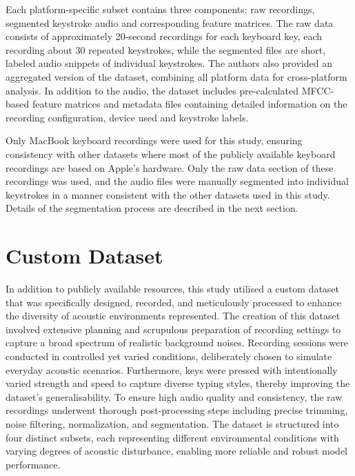 \documentclass[a4paper,11pt,twoside]{report}
\theoremstyle{definition}
\begin{document}
Each platform-specific subset contains three components: raw recordings, segmented keystroke audio and corresponding feature matrices. The raw data consists of approximately 20-second recordings for each keyboard key, each recording about 30 repeated keystrokes, while the segmented files are short, labeled audio snippets of individual keystrokes. The authors also provided an aggregated version of the dataset, combining all platform data for cross-platform analysis. In addition to the audio, the dataset includes pre-calculated MFCC-based feature matrices and metadata files containing detailed information on the recording configuration, device used and keystroke labels.

Only MacBook keyboard recordings were used for this study, ensuring consistency with other datasets where most of the publicly available keyboard recordings are based on Apple's hardware. Only the raw data section of these recordings was used, and the audio files were manually segmented into individual keystrokes in a manner consistent with the other datasets used in this study. Details of the segmentation process are described in the next section.


\section{Custom Dataset}
\label{customDataset}

In addition to publicly available resources, this study utilised a custom dataset that was specifically designed, recorded, and meticulously processed to enhance the diversity of acoustic environments represented. The creation of this dataset involved extensive planning and  scrupulous preparation of recording settings to capture a broad spectrum of realistic background noises. Recording sessions were conducted in controlled yet varied conditions, deliberately chosen to simulate everyday acoustic scenarios. Furthermore, keys were pressed with intentionally varied strength and speed to capture diverse typing styles, thereby improving the dataset’s generalisability. To ensure high audio quality and consistency, the raw recordings underwent thorough post-processing steps including precise trimming, noise filtering, normalization, and segmentation. The dataset is structured into four distinct subsets, each representing different environmental conditions with varying degrees of acoustic disturbance, enabling more reliable and robust model performance.
\end{document}
